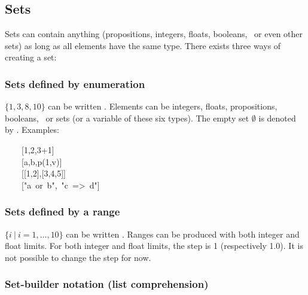 \subsection{Sets}\label{sec-sets}%

\noindent Sets can contain anything (propositions, integers, floats,
booleans,~ or even other sets) as long
as all elements have the same type. There exists three ways of creating a
set:%

\subsubsection{Sets defined by enumeration}\label{sec-sets-defined-by-enumeration}%

\noindent$\{1,3,8,10\}$ can be written . Elements can be integers,
floats, propositions, booleans,~ or
sets (or a variable of these six types). The empty set $\emptyset$ is
denoted by \mdcode{{}[]}. Examples:%
\begin{mdpre}%
\noindent~~~~{}[{1},{2},{3}+{1}]\\
~~~~{}[a,b,p({1},v)]\\
~~~~{}[{}[{1},{2}],{}[{3},{4},{5}]]\\
~~~~{}["a~or~b",~"c~=\textgreater{}~d"]%
\end{mdpre}
\subsubsection{Sets defined by a range}\label{sec-sets-defined-by-a-range}%

\noindent$\{i~|~i=1,\dots,10\}$ can be written . Ranges can
be produced with both integer and float limits. For both integer and float
limits, the step is 1 (respectively 1.0). It is not possible to change the step for now.%

\subsubsection{Set-builder notation (list comprehension)}\label{set-builder}%

